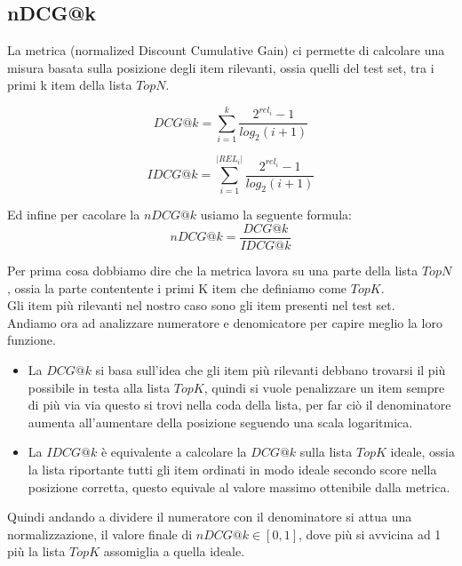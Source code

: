 \subsection{nDCG@k}
La metrica  (normalized Discount Cumulative Gain) ci permette di calcolare una misura basata sulla posizione degli item rilevanti, ossia quelli del test set, tra i primi k item della lista $TopN$.

\begin{minipage}[H]{0.5\textwidth}
	$$DCG@k = \sum_{i=1}^{k} \frac{2^{rel_i} - 1}{log_{2} (i + 1)}$$
\end{minipage}
\begin{minipage}[H]{0.5\textwidth}
	$$IDCG@k = \sum_{i=1}^{|REL_i|} \frac{2^{rel_i} - 1}{log_{2} (i + 1)}$$
\end{minipage}
\newline

Ed infine per cacolare la $nDCG@k$ usiamo la seguente formula:
$$nDCG@k = \frac{DCG@k}{IDCG@k}$$

Per prima cosa dobbiamo dire che la metrica lavora su una parte della lista $TopN$, ossia la parte contentente i primi K item che definiamo come $TopK$.\\
Gli item più rilevanti nel nostro caso sono gli item presenti nel test set.\\
Andiamo ora ad analizzare numeratore e denomicatore per capire meglio la loro funzione.
\begin{itemize}
	\item La $DCG@k$ si basa sull'idea che gli item più rilevanti debbano trovarsi il più possibile in testa alla lista $TopK$, quindi si vuole penalizzare un item sempre di più via via questo si trovi nella coda della lista, per far ciò il denominatore aumenta all'aumentare della posizione seguendo una scala logaritmica. 
	\item La $IDCG@k$ è equivalente a calcolare la $DCG@k$ sulla lista $TopK$ ideale, ossia la lista riportante tutti gli item ordinati in modo ideale secondo score nella posizione corretta, questo equivale al valore massimo ottenibile dalla metrica. 
\end{itemize}

Quindi andando a dividere il numeratore con il denominatore si attua una normalizzazione, il valore finale di $nDCG@k \in [0,1]$, dove più si avvicina ad 1 più la lista $TopK$ assomiglia a quella ideale.